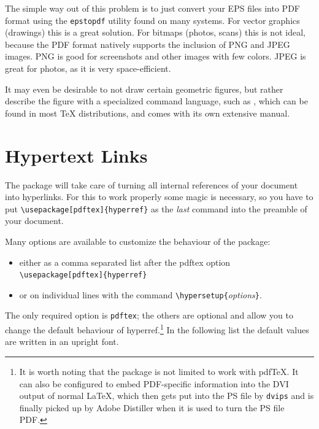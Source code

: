 \documentclass[twoside,11pt,letterpaper]{article}
\begin{document}
The simple way out of this problem is to just convert your EPS files
into PDF format using the \texttt{epstopdf} utility found on many
systems. For vector graphics (drawings) this is a great solution. For
bitmaps (photos, scans) this is not ideal, because the PDF format
natively supports the inclusion of PNG and JPEG images. PNG is
good for screenshots and other images with few colors. JPEG is great
for photos, as it is very space-efficient.

It may even be desirable to not draw certain geometric figures, 
but rather describe the figure with a specialized command language, such as
, which can be found in most \TeX{} distributions, and
comes with its own extensive manual.

\section{Hypertext Links}
\label{ssec:pdfhyperref}

The  package will take care of turning all internal
references of your document into hyperlinks. For this to work
properly some magic is necessary, so you have to put
\verb+\usepackage[pdftex]{hyperref}+ as the \emph{last} command into
the preamble of your document.

Many options are available to customize the behaviour of the
 package:
\begin{itemize}
\item either as a comma separated list after the pdftex option\\
  \verb+\usepackage[pdftex]{hyperref}+
\item or on individual lines with the command
  \verb+\hypersetup{+\emph{options}\verb+}+.
\end{itemize}

The only required option is \texttt{pdftex}; the others are
optional and allow you to change the default behaviour of hyperref.\footnote{It
is worth noting that the  package is not limited to
work with pdf\TeX{}. It can also be configured to embed PDF-specific
information into the DVI output of normal \LaTeX{}, which then gets put
into the PS file by \texttt{dvips} and is finally picked up by Adobe
Distiller when it is used to turn the PS file PDF.} In the following
list the default values are written in an upright font.
\end{document}
